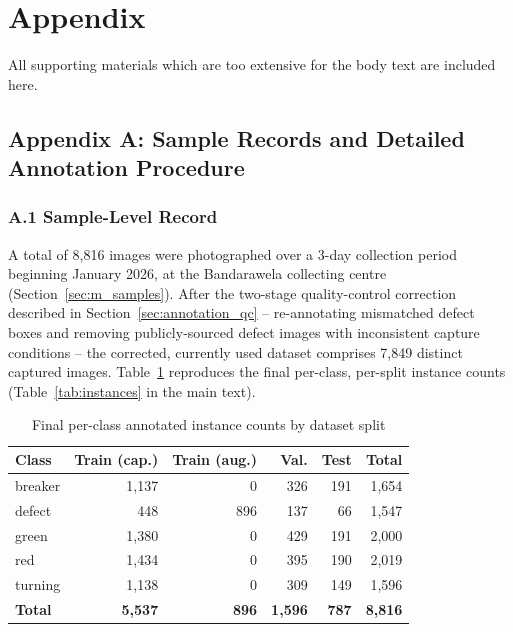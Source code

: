 \section*{Appendix}

All supporting materials which are too extensive for the body text are included here.

\label{app:A}
\subsection*{Appendix A: Sample Records and Detailed Annotation Procedure}

\subsubsection*{A.1 Sample-Level Record}

A total of 8{,}816 images were photographed over a 3-day collection period beginning January 2026, at the Bandarawela collecting centre (Section~\ref{sec:m_samples}). After the two-stage quality-control correction described in Section~\ref{sec:annotation_qc} -- re-annotating mismatched defect boxes and removing publicly-sourced defect images with inconsistent capture conditions -- the corrected, currently used dataset comprises 7{,}849 distinct captured images. Table~\ref{tab:appendixA_samples} reproduces the final per-class, per-split instance counts (Table~\ref{tab:instances} in the main text).

\begin{table}[H]
\caption{Final per-class annotated instance counts by dataset split}
\label{tab:appendixA_samples}
\centering
\begin{tabular}{lrrrrr}
\toprule
\textbf{Class} & \textbf{Train (cap.)} & \textbf{Train (aug.)} & \textbf{Val.} & \textbf{Test} & \textbf{Total} \\
\midrule
breaker & 1{,}137 & 0   & 326 & 191 & 1{,}654 \\
defect  & 448   & 896 & 137 & 66  & 1{,}547 \\
green   & 1{,}380 & 0   & 429 & 191 & 2{,}000 \\
red     & 1{,}434 & 0   & 395 & 190 & 2{,}019 \\
turning & 1{,}138 & 0   & 309 & 149 & 1{,}596 \\
\midrule
\textbf{Total} & \textbf{5{,}537} & \textbf{896} & \textbf{1{,}596} & \textbf{787} & \textbf{8{,}816} \\
\bottomrule
\end{tabular}
\end{table}


